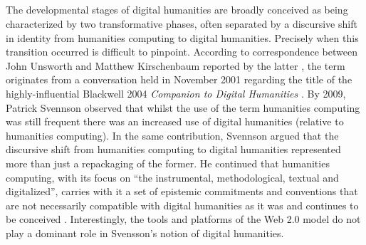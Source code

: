 \begin{paper}
\section*{}
The developmental stages of digital humanities are broadly conceived as being characterized by two transformative phases, often separated by a discursive shift in identity from humanities computing to digital humanities. Precisely when this transition occurred is difficult to pinpoint. According to correspondence between John Unsworth and Matthew Kirschenbaum reported by the latter \citep[56--57]{kirschenbaum_digital_2010}, the term originates from a conversation held in November 2001 regarding the title of the highly-influential Blackwell 2004 \textit{Companion to Digital Humanities} \citep{schreibman_companion_2014}. By 2009, Patrick Svennson observed that whilst the use of the term humanities computing was still frequent there was an increased use of digital humanities (relative to humanities computing). In the same contribution, Svennson argued that the discursive shift from humanities computing to digital humanities represented more than just a repackaging of the former. He continued that humanities computing, with its focus on ``the instrumental, methodological, textual and digitalized'', carries with it a set of epistemic commitments and conventions that are not necessarily compatible with digital humanities as it was and continues to be conceived \citep{svensson_humanities_2009}. Interestingly, the tools and platforms of the Web 2.0 model do not play a dominant role in Svensson’s notion of digital humanities.


\end{paper}
